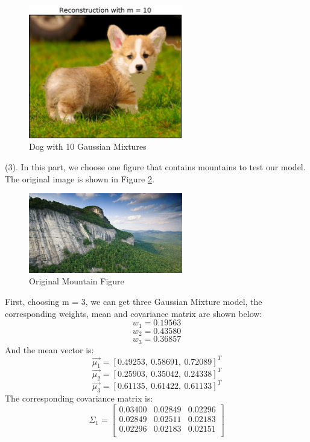 \begin{figure}[H]
\centering
\includegraphics[width=0.6\textwidth]{./figures/corgi_10.png}
\caption{\label{fig:corgi_10} Dog with 10 Gaussian Mixtures}
\end{figure}

\newpage
(3). In this part, we choose one figure that contains mountains to test our model. The original image is shown in Figure \ref{fig:self}.
\begin{figure}[H]
\centering
\includegraphics[width=0.6\textwidth]{./figures/self.jpg}
\caption{\label{fig:self} Original Mountain Figure}
\end{figure}

First, choosing m = 3, we can get three Gaussian Mixture model, the corresponding weights, mean and covariance matrix are shown below:
$$ w_1 = 0.19563 $$
$$ w_2 = 0.43580 $$
$$ w_3 = 0.36857 $$
And the mean vector is:
$$ \vec{\mu_1} = [0.49253, \  0.58691, \  0.72089]^T$$
$$ \vec{\mu_2} = [0.25903, \  0.35042, \  0.24338]^T$$
$$ \vec{\mu_3} = [0.61135, \  0.61422, \  0.61133]^T$$
The corresponding covariance matrix is:
$$\Sigma_1 =
\begin{bmatrix}
	0.03400	&	0.02849	&	0.02296 \\ 
	0.02849	&	0.02511	&	0.02183 \\
	0.02296	&	0.02183	&	0.02151	\\
\end{bmatrix}$$


